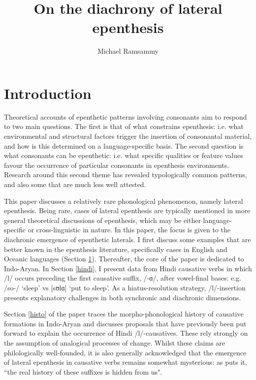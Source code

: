 \documentclass[output=paper,colorlinks,citecolor=brown]{langscibook}
\title{On the diachrony of lateral epenthesis}
\author{Michael Ramsammy\orcid{}\affiliation{University of Edinburgh}}
\begin{document}
\maketitle \label{ch11}

\renewcommand{\rowletter}{\stepcounter{tableaurow}\roman{tableaurow}.}
\section{Introduction} \label{intro}
Theoretical accounts of epenthetic patterns involving consonants aim to respond to two main questions. The first is that of what constrains epenthesis: i.e. what environmental and structural factors trigger the insertion of consonantal material, and how is this determined on a language-specific basis. The second question is what consonants can be epenthetic: i.e. what specific qualities or feature values favour the occurrence of particular consonants in epenthesis environments. Research around this second theme has revealed typologically common patterns, and also some that are much less well attested.

This paper discusses a relatively rare phonological phenomenon, namely lateral epenthesis.  Being rare, cases of lateral epenthesis are typically mentioned in more general theoretical discussions of epenthesis, which may be either language\hyp specific or cross-linguistic in nature.  In this paper, the focus is given to the diachronic emergence of epenthetic laterals.  I first discuss some examples that are better known in the epenthesis literature, specifically cases in English and Oceanic languages (Section \ref{intro}).  Thereafter, the core of the paper is dedicated to Indo-Aryan.  In Section \ref{hindi}, I present data from Hindi causative verbs in which /l/ occurs preceding the first causative suffix, /-ɑ/, after vowel-final bases: e.g. /so-/ `sleep' vs [sʊlɑ] `put to sleep'.  As a hiatus-resolution strategy, /l/-insertion presents explanatory challenges in both synchronic and diachronic dimensions.

Section \ref{histo} of the paper traces the morpho-phonological history of causative formations in Indo-Aryan and discusses proposals that have previously been put forward to explain the occurrence of Hindi /l/-causatives.  These rely strongly on the assumption of analogical processes of change.  Whilst these claims are philologically well-founded, it is also generally acknowledged that the emergence of lateral epenthesis in causative verbs remains somewhat mysterious: as \citet[141]{Bloch1965} puts it, ``the real history of these suffixes is hidden from us".  
\end{document}
